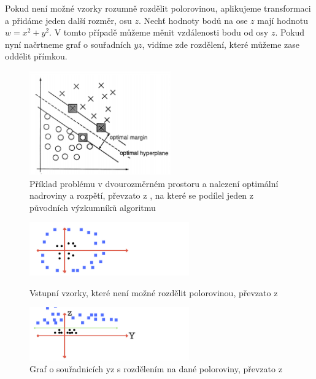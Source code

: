 Pokud není možné vzorky rozumně rozdělit polorovinou, aplikujeme transformaci a přidáme jeden další rozměr, osu $z$. Nechť hodnoty bodů na ose $z$ mají hodnotu $w = x^2 + y^2$. V tomto případě můžeme měnit vzdálenosti bodu od osy $z$. Pokud nyní načrtneme graf o souřadních $yz$, vidíme zde rozdělení, které můžeme zase oddělit přímkou. 

\begin{figure}[!htbp]
    \centering
    \includegraphics[width=230px]{obrazky-figures/svmVapnik.png}
    \caption{Příklad problému v dvourozměrném prostoru a nalezení optimální nadroviny a rozpětí, převzato z \cite{VapnikSVM}, na které se podílel jeden z původních výzkumníků algoritmu}
\end{figure}

\begin{figure}[!htbp]
  \begin{minipage}[b]{0.5\linewidth}
  \centering
   \includegraphics[width=260px]{obrazky-figures/mediumsvm1.png}
   \caption{Vstupní vzorky, které není možné rozdělit polorovinou, převzato z \cite{MediumSVM}}
  \end{minipage}
   \hspace{0.5cm}
  \begin{minipage}[b]{0.5\linewidth}
  \centering
   \includegraphics[width=260px]{obrazky-figures/mediumsvm2.png}
  \caption{Graf o souřadnicích yz s rozdělením na dané poloroviny, převzato z \cite{MediumSVM}} 
  \end{minipage}
 \end{figure}

